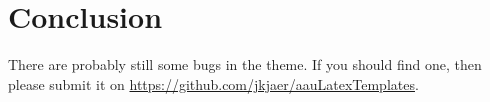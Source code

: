 \section{Conclusion}\label{sec:conclusion}
There are probably still some bugs in the theme. If you should find one, then please submit it on \url{https://github.com/jkjaer/aauLatexTemplates}.
